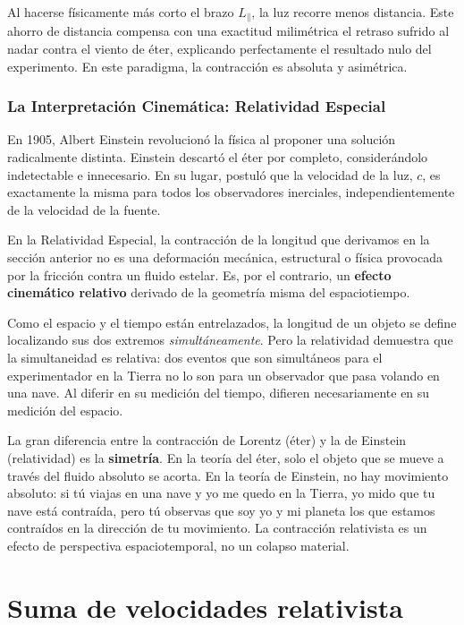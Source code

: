 \documentclass[11pt,a4paper]{book}
\begin{document}
Al hacerse físicamente más corto el brazo $L_\parallel$, la luz recorre menos distancia. Este ahorro de distancia compensa con una exactitud milimétrica el retraso sufrido al nadar contra el viento de éter, explicando perfectamente el resultado nulo del experimento. En este paradigma, la contracción es absoluta y asimétrica.

\subsubsection*{La Interpretación Cinemática: Relatividad Especial}

En 1905, Albert Einstein revolucionó la física al proponer una solución radicalmente distinta. Einstein descartó el éter por completo, considerándolo indetectable e innecesario. En su lugar, postuló que la velocidad de la luz, $c$, es exactamente la misma para todos los observadores inerciales, independientemente de la velocidad de la fuente.

En la Relatividad Especial, la contracción de la longitud que derivamos en la sección anterior no es una deformación mecánica, estructural o física provocada por la fricción contra un fluido estelar. Es, por el contrario, un \textbf{efecto cinemático relativo} derivado de la geometría misma del espaciotiempo. 

Como el espacio y el tiempo están entrelazados, la longitud de un objeto se define localizando sus dos extremos \textit{simultáneamente}. Pero la relatividad demuestra que la simultaneidad es relativa: dos eventos que son simultáneos para el experimentador en la Tierra no lo son para un observador que pasa volando en una nave. Al diferir en su medición del tiempo, difieren necesariamente en su medición del espacio.

La gran diferencia entre la contracción de Lorentz (éter) y la de Einstein (relatividad) es la \textbf{simetría}. En la teoría del éter, solo el objeto que se mueve a través del fluido absoluto se acorta. En la teoría de Einstein, no hay movimiento absoluto: si tú viajas en una nave y yo me quedo en la Tierra, yo mido que tu nave está contraída, pero tú observas que soy yo y mi planeta los que estamos contraídos en la dirección de tu movimiento. La contracción relativista es un efecto de perspectiva espaciotemporal, no un colapso material.

\section{Suma de velocidades relativista}
\end{document}
